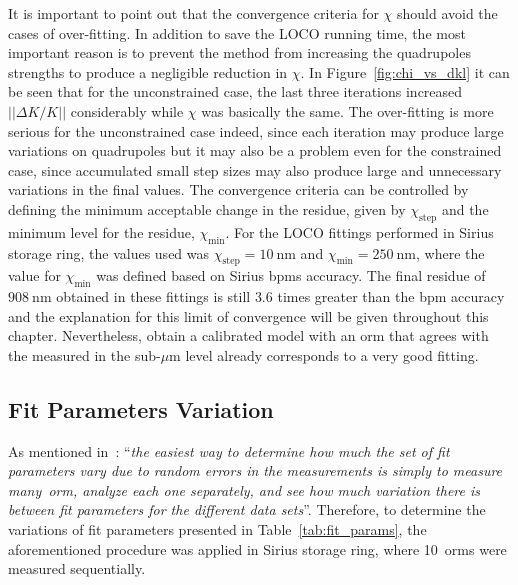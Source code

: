 It is important to point out that the convergence criteria for $\chi$ should avoid the cases of over-fitting. In addition to save the LOCO running time, the most important reason is to prevent the method from increasing the quadrupoles strengths to produce a negligible reduction in $\chi$. In Figure~\ref{fig:chi_vs_dkl} it can be seen that for the unconstrained case, the last three iterations increased $||\Delta K/K||$ considerably while $\chi$ was basically the same. The over-fitting is more serious for the unconstrained case indeed, since each iteration may produce large variations on quadrupoles but it may also be a problem even for the constrained case, since accumulated small step sizes may also produce large and unnecessary variations in the final values. The convergence criteria can be controlled by defining the minimum acceptable change in the residue, given by $\chi_{\mathrm{step}}$ and the minimum level for the residue, $\chi_{\mathrm{min}}$. For the LOCO fittings performed in Sirius storage ring, the values used was $\chi_{\mathrm{step}} = \SI{10}{\nano\meter}$ and $\chi_{\mathrm{min}} = \SI{250}{\nano\meter}$, where the value for $\chi_{\mathrm{min}}$ was defined based on Sirius \glspl{bpm} accuracy. The final residue of $\SI{908}{\nano\meter}$ obtained in these fittings is still $3.6$ times greater than the \gls{bpm} accuracy and the explanation for this limit of convergence will be given throughout this chapter. Nevertheless, obtain a calibrated model with an \gls{orm} that agrees with the measured in the sub-$\mu$m level already corresponds to a very good fitting.

\subsection{Fit Parameters Variation}\label{subsec:fit_var}
As mentioned in~\cite{safranek1997}: ``\textit{the easiest way to determine how much the set of fit parameters vary due to random errors in the measurements is simply to measure many~\gls{orm}, analyze each one separately, and see how much variation there is between fit parameters for the different data sets}''. Therefore, to determine the variations of fit parameters presented in Table~\ref{tab:fit_params}, the aforementioned procedure was applied in Sirius storage ring, where 10~\glspl{orm} were measured sequentially. 

